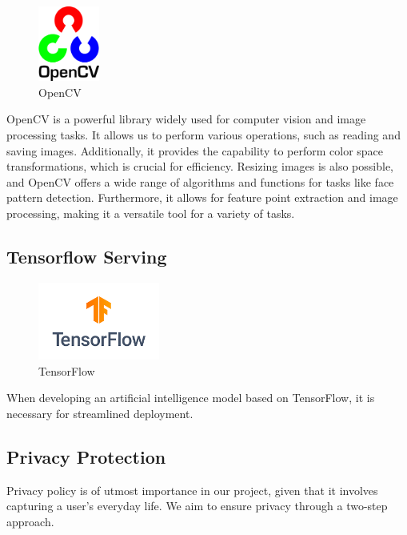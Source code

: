 \begin{figure}[htp]
\centering
\includegraphics[width=2cm]{images/opencv.png}
\caption{OpenCV}
\label{fig:opencv}
\end{figure}

OpenCV is a powerful library widely used for computer vision and image processing tasks. It allows us to perform various operations, such as reading and saving images. Additionally, it provides the capability to perform color space transformations, which is crucial for efficiency. Resizing images is also possible, and OpenCV offers a wide range of algorithms and functions for tasks like face pattern detection. Furthermore, it allows for feature point extraction and image processing, making it a versatile tool for a variety of tasks.\\



\subsection{\textbf{Tensorflow Serving}}

\begin{figure}[htp]
\centering
\includegraphics[width=4cm]{images/tensorflow.png}
\caption{TensorFlow}
\label{fig:tensorflow}
\end{figure}

When developing an artificial intelligence model based on TensorFlow, it is necessary for streamlined deployment.\\

\subsection{\textbf{Privacy Protection}}
Privacy policy is of utmost importance in our project, given that it involves capturing a user's everyday life. We aim to ensure privacy through a two-step approach. \\

